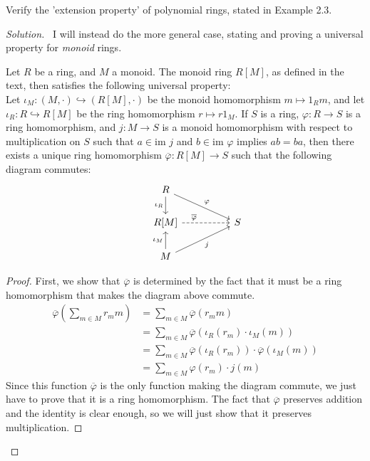 \documentclass[12pt]{article}
\newenvironment{problem}[2][Problem]{\begin{trivlist}
\item[\hskip \labelsep {\bfseries #1}\hskip \labelsep {\bfseries #2.}]}{\end{trivlist}}
\newenvironment{proposition}[1][Proposition]{\begin{trivlist}
\item[\hskip \labelsep {\bfseries #1.}]}{\end{trivlist}}
\newcommand{\im}{\text{im }}
\newenvironment{solution}
  {\renewcommand\qedsymbol{$\blacksquare$}\begin{proof}[Solution]}
{\end{proof}}
\newenvironment{sproof}{
  \renewcommand\qedsymbol{$\square$}
  \begin{proof}
  }{
  \end{proof}
}
\theoremstyle{remark}
\begin{document}
\begin{problem}{6}
Verify the 'extension property' of polynomial rings, stated in Example 2.3.
\end{problem}
\begin{solution}\ 
  I will instead do the more general case, stating and proving a universal property for \textit{monoid} rings.
  \begin{proposition}
    Let $R$ be a ring, and $M$ a monoid.
    The monoid ring $R[M]$, as defined in the text, then satisfies the following universal property:\\
    \indent Let $\iota_M : (M,\cdot)\hookrightarrow (R[M],\cdot)$ be the monoid homomorphism
    $m\mapsto 1_Rm$, and let $\iota_R:R\hookrightarrow R[M]$ be the ring homomorphism
    $r\mapsto r1_M$.
    If $S$ is a ring, $\varphi:R\to S$ is a ring homomorphism, and $j:M\to S$ is a monoid homomorphism
    with respect to multiplication on $S$ such that $a\in\im j$ and $b\in\im\varphi$ implies $ab=ba$,
    then there exists a unique ring homomorphism $\overline\varphi:R[M]\to S$ such that the following
    diagram commutes:
    \[
      \begin{tikzcd}
        & R \ar{d}[swap]{\iota_R} \ar{drr}{\varphi} \\
        & R[M] \ar[dashed,near start]{rr}{\overline\varphi} && S \\
        & M \ar{u}{\iota_M} \ar{urr}[swap]{j}
      \end{tikzcd}
    \]
  \end{proposition}
  \begin{sproof}
  First, we show that $\overline\varphi$ is determined by the fact that it must be a ring homomorphism
  that makes the diagram above commute.
  \begin{align*}
    \overline\varphi\left( \sum_{m\in M} r_mm \right) &=\sum_{m\in M}\overline\varphi(r_mm) \\
    &= \sum_{m\in M} \overline\varphi(\iota_R(r_m)\cdot\iota_M(m)) \\
    &= \sum_{m\in M} \overline\varphi(\iota_R(r_m))\cdot\overline\varphi(\iota_M(m)) \\
    &= \sum_{m\in M} \varphi(r_m)\cdot j(m)
  \end{align*}
  \indent Since this function $\overline\varphi$ is the only function making the diagram commute, 
  we just have to prove that it is a ring homomorphism.
  The fact that $\overline\varphi$ preserves addition and the identity is clear enough, so we will
  just show that it preserves multiplication.

\end{sproof}
\end{solution}
\end{document}
